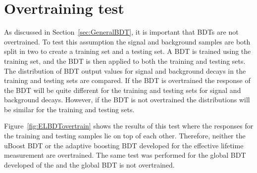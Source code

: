 \section{Overtraining test}
As discussed in Section~\ref{sec:GeneralBDT}, it is important that BDTs are not overtrained. %
To test this assumption the signal and background samples are both split in two to create a training set and a testing set.
A BDT is trained using the training set, and the BDT is then applied to both the training and testing sets. The distribution of BDT output values for signal and background decays in the training and testing sets are compared. If the BDT is overtrained the response of the BDT will be quite different for the training and testing sets for signal and background decays. However, if the BDT is not overtrained the distributions will be similar for the training and testing sets. 

Figure~\ref{fig:ELBDTovertrain} shows the results of this test where the responses for the training and testing samples lie on top of each other. Therefore, neither the uBoost BDT or the adaptive boosting BDT developed for the effective lifetime measurement are overtrained. The same test was performed for the global BDT developed of the \BFm and the global BDT is not overtrained.  


